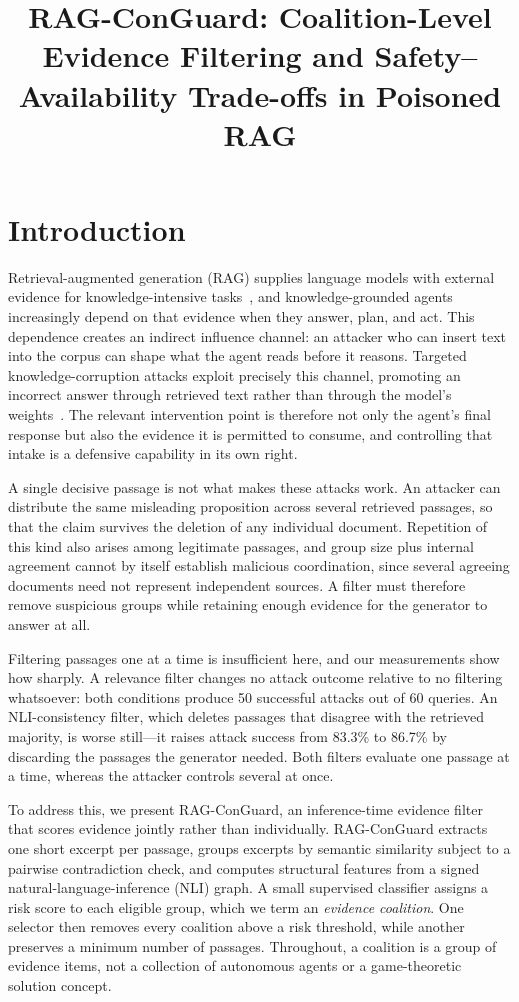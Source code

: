 \documentclass[sigconf]{aamas}
\title[RAG-ConGuard: Coalition-Level Evidence Filtering]{RAG-ConGuard: Coalition-Level Evidence Filtering and Safety--Availability Trade-offs in Poisoned RAG}
\begin{document}
\maketitle

\section{Introduction}
Retrieval-augmented generation (RAG) supplies language models with external evidence for knowledge-intensive tasks~\cite{rag}, and knowledge-grounded agents increasingly depend on that evidence when they answer, plan, and act. This dependence creates an indirect influence channel: an attacker who can insert text into the corpus can shape what the agent reads before it reasons. Targeted knowledge-corruption attacks exploit precisely this channel, promoting an incorrect answer through retrieved text rather than through the model's weights~\cite{poisonedrag}. The relevant intervention point is therefore not only the agent's final response but also the evidence it is permitted to consume, and controlling that intake is a defensive capability in its own right.

A single decisive passage is not what makes these attacks work. An attacker can distribute the same misleading proposition across several retrieved passages, so that the claim survives the deletion of any individual document. Repetition of this kind also arises among legitimate passages, and group size plus internal agreement cannot by itself establish malicious coordination, since several agreeing documents need not represent independent sources. A filter must therefore remove suspicious groups while retaining enough evidence for the generator to answer at all.

Filtering passages one at a time is insufficient here, and our measurements show how sharply. A relevance filter changes no attack outcome relative to no filtering whatsoever: both conditions produce 50 successful attacks out of 60 queries. An NLI-consistency filter, which deletes passages that disagree with the retrieved majority, is worse still---it raises attack success from 83.3\% to 86.7\% by discarding the passages the generator needed. Both filters evaluate one passage at a time, whereas the attacker controls several at once.

To address this, we present RAG-ConGuard, an inference-time evidence filter that scores evidence jointly rather than individually. RAG-ConGuard extracts one short excerpt per passage, groups excerpts by semantic similarity subject to a pairwise contradiction check, and computes structural features from a signed natural-language-inference (NLI) graph. A small supervised classifier assigns a risk score to each eligible group, which we term an \emph{evidence coalition}. One selector then removes every coalition above a risk threshold, while another preserves a minimum number of passages. Throughout, a coalition is a group of evidence items, not a collection of autonomous agents or a game-theoretic solution concept.
\end{document}
